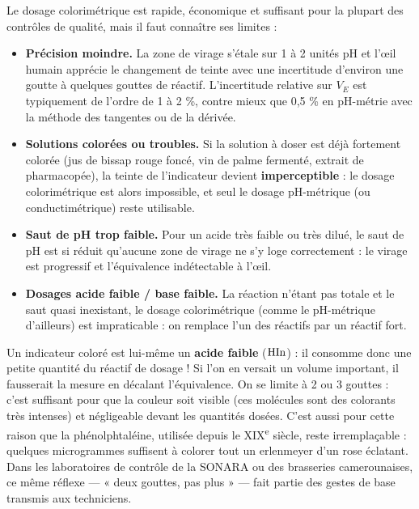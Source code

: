 \documentclass[11pt]{article}
\begin{document}
Le dosage colorimétrique est rapide, économique et suffisant pour la plupart des contrôles de qualité, mais il faut connaître ses limites :

\begin{itemize}
  \item \textbf{Précision moindre.} La zone de virage s'étale sur 1 à 2 unités pH et l'œil humain apprécie le changement de teinte avec une incertitude d'environ une goutte à quelques gouttes de réactif. L'incertitude relative sur $V_E$ est typiquement de l'ordre de 1 à 2 \%, contre mieux que 0,5 \% en pH-métrie avec la méthode des tangentes ou de la dérivée.
  \item \textbf{Solutions colorées ou troubles.} Si la solution à doser est déjà fortement colorée (jus de bissap rouge foncé, vin de palme fermenté, extrait de pharmacopée), la teinte de l'indicateur devient \textbf{imperceptible} : le dosage colorimétrique est alors impossible, et seul le dosage pH-métrique (ou conductimétrique) reste utilisable.
  \item \textbf{Saut de pH trop faible.} Pour un acide très faible ou très dilué, le saut de pH est si réduit qu'aucune zone de virage ne s'y loge correctement : le virage est progressif et l'équivalence indétectable à l'œil.
  \item \textbf{Dosages acide faible / base faible.} La réaction n'étant pas totale et le saut quasi inexistant, le dosage colorimétrique (comme le pH-métrique d'ailleurs) est impraticable : on remplace l'un des réactifs par un réactif fort.
\end{itemize}

\begin{savaistu}
Un indicateur coloré est lui-même un \textbf{acide faible} ($\ce{HIn}$) : il consomme donc une petite quantité du réactif de dosage ! Si l'on en versait un volume important, il fausserait la mesure en décalant l'équivalence. On se limite à 2 ou 3 gouttes : c'est suffisant pour que la couleur soit visible (ces molécules sont des colorants très intenses) et négligeable devant les quantités dosées. C'est aussi pour cette raison que la phénolphtaléine, utilisée depuis le XIX\textsuperscript{e} siècle, reste irremplaçable : quelques microgrammes suffisent à colorer tout un erlenmeyer d'un rose éclatant. Dans les laboratoires de contrôle de la SONARA ou des brasseries camerounaises, ce même réflexe — « deux gouttes, pas plus » — fait partie des gestes de base transmis aux techniciens.
\end{savaistu}
\end{document}
